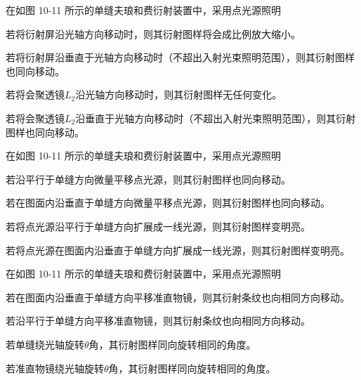 \documentclass[padl, analysis, notocnum]{ExBook}
\newcommand{\answerarea}[1][3.5cm]{%
  \par\vspace{1mm}%
  \noindent{\color{themeColor!35}\rule{\linewidth}{0.4pt}}\par
  \noindent\begin{minipage}[t][#1][t]{\linewidth}\vspace{0pt}\end{minipage}\par
  \noindent{\color{themeColor!35}\rule{\linewidth}{0.4pt}}\par
}
\begin{document}
\begin{qitems}[startnum=3]
\qitem 在如图 10-11 所示的单缝夫琅和费衍射装置中，采用点光源照明
\par\noindent\hspace{2em}若将衍射屏沿光轴方向移动时，则其衍射图样将会成比例放大缩小。
\par\noindent\hspace{2em}若将衍射屏沿垂直于光轴方向移动时（不超出入射光束照明范围），则其衍射图样也同向移动。
\par\noindent\hspace{2em}若将会聚透镜$L_{2}$沿光轴方向移动时，则其衍射图样无任何变化。
\par\noindent\hspace{2em}若将会聚透镜$L_{2}$沿垂直于光轴方向移动时（不超出入射光束照明范围），则其衍射图样也同向移动。
\label{q:261:start}
\answerarea[1.6cm]
\label{q:261:end}
\end{qitems}

\begin{qitems}[startnum=4]
\qitem 在如图 10-11 所示的单缝夫琅和费衍射装置中，采用点光源照明
\par\noindent\hspace{2em}若沿平行于单缝方向微量平移点光源，则其衍射图样也同向移动。
\par\noindent\hspace{2em}若在图面内沿垂直于单缝方向微量平移点光源，则其衍射图样也同向移动。
\par\noindent\hspace{2em}若将点光源沿平行于单缝方向扩展成一线光源，则其衍射图样变明亮。
\par\noindent\hspace{2em}若将点光源在图面内沿垂直于单缝方向扩展成一线光源，则其衍射图样变明亮。
\label{q:262:start}
\answerarea[1.6cm]
\label{q:262:end}
\end{qitems}

\begin{qitems}[startnum=5]
\qitem 在如图 10-11 所示的单缝夫琅和费衍射装置中，采用点光源照明
\par\noindent\hspace{2em}若在图面内沿垂直于单缝方向平移准直物镜，则其衍射条纹也向相同方向移动。
\par\noindent\hspace{2em}若沿平行于单缝方向平移准直物镜，则其衍射条纹也向相同方向移动。
\par\noindent\hspace{2em}若单缝绕光轴旋转$\theta$角，其衍射图样同向旋转相同的角度。
\par\noindent\hspace{2em}若准直物镜绕光轴旋转$\theta$角，其衍射图样同向旋转相同的角度。
\label{q:263:start}
\answerarea[1.6cm]
\label{q:263:end}
\end{qitems}
\end{document}
